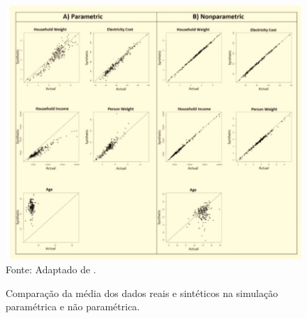 \documentclass[
	12pt,				%
	openright,			%
	oneside,			%
	a4paper,			%
	english,			%
	brazil				%
	]{abntex2}
\begin{document}
		\begin{figure}[h!]
			\centering
			\caption{Comparação da média dos dados reais e sintéticos na simulação paramétrica e não paramétrica.}
			\includegraphics[width=\linewidth]{./figures/TrabalhosRelacionados/SakshaugandRaghunathan.jpg}
			\label{fig:SakshaugandRaghunathan}
			\footnotesize Fonte: Adaptado de \cite{sakshaug2014nonparametric}.
		\end{figure}
\end{document}
